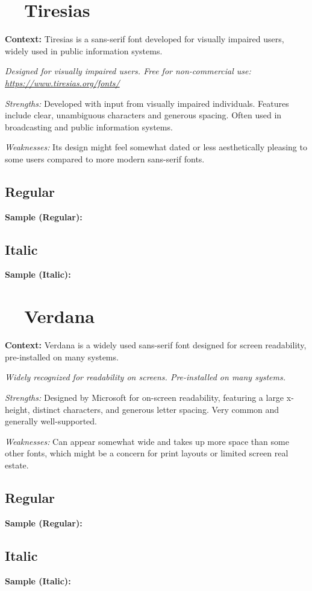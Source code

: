 \pagebreak
\section{~~Tiresias}\label{app5:sec:tiresias}
\noindent
\textbf{Context:} Tiresias is a sans-serif font developed for visually impaired users, widely used in public information systems.

\emph{Designed for visually impaired users. Free for non-commercial use: \url{https://www.tiresias.org/fonts/}}
\begin{raggedright}
	\emph{Strengths:} Developed with input from visually impaired individuals. Features include clear, unambiguous characters and generous spacing. Often used in broadcasting and public information systems.

	\emph{Weaknesses:} Its design might feel somewhat dated or less aesthetically pleasing to some users compared to more modern sans-serif fonts.

	\subsection{Regular}
	\noindent\textbf{Sample (Regular):}
	\FontSample{\tiresiasfont}

	\subsection{Italic}
	\noindent\textbf{Sample (Italic):}
	\FontSample{{\tiresiasfont\itshape}}
\end{raggedright}


\pagebreak
\section{~~Verdana}\label{app5:sec:verdana}
\noindent
\textbf{Context:} Verdana is a widely used sans-serif font designed for screen readability, pre-installed on many systems.

\emph{Widely recognized for readability on screens. Pre-installed on many systems.}
\begin{raggedright}
	\emph{Strengths:} Designed by Microsoft for on-screen readability, featuring a large x-height, distinct characters, and generous letter spacing. Very common and generally well-supported.

	\emph{Weaknesses:} Can appear somewhat wide and takes up more space than some other fonts, which might be a concern for print layouts or limited screen real estate.

	\subsection{Regular}
	\noindent\textbf{Sample (Regular):}
	\FontSample{\verdanafont}

	\subsection{Italic}
	\noindent\textbf{Sample (Italic):}
	\FontSample{{\verdanafont\itshape}}
\end{raggedright}




